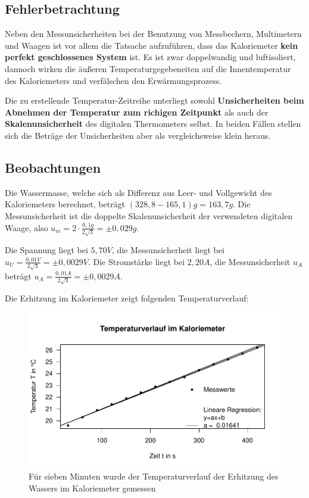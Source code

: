 \documentclass[class=article, crop=false]{standalone}
\begin{document}
\hypertarget{fehlerbetrachtung}{%
\subsection{Fehlerbetrachtung}\label{fehlerbetrachtung}}

Neben den Messunsicherheiten bei der Benutzung von Messbechern,
Multimetern und Waagen ist vor allem die Tatsache aufzuführen, dass das
Kaloriemeter \textbf{kein perfekt geschlossenes System} ist. Es ist zwar
doppelwandig und luftisoliert, dannoch wirken die äußeren
Temperaturgegebeneiten auf die Innentemperatur des Kaloriemeters und
verfälschen den Erwärmungsprozess.

Die zu erstellende Temperatur-Zeitreihe unterliegt sowohl
\textbf{Unsicherheiten beim Abnehmen der Temperatur zum richigen
Zeitpunkt} als auch der \textbf{Skalenunsicherheit} des digitalen
Thermometers selbst. In beiden Fällen stellen sich die Beträge der
Unsicherheiten aber als vergleichsweise klein heraus.

\hypertarget{beobachtungen}{%
\subsection{Beobachtungen}\label{beobachtungen}}

Die Wassermasse, welche sich als Differenz aus Leer- und Vollgewicht des
Kaloriemeters berechnet, beträgt \((328,8-165,1)g=163,7g\). Die
Messunsicherheit ist die doppelte Skalenunsicherheit der verwendeten
digitalen Waage, also \(u_m=2\cdot \frac{0,1g}{2\sqrt{3}} = \pm0,029g\).

Die Spannung liegt bei \(5,70V\), die Messunsicherheit liegt bei
\(u_U=\frac{0,01V}{2\sqrt{3}}= \pm0,0029V\). Die Stromstärke liegt bei
\(2,20A\), die Messunsicherheit \(u_A\) beträgt
\(u_A=\frac{0,01A}{2\sqrt{3}}=\pm0,0029A\).

Die Erhitzung im Kaloriemeter zeigt folgenden Temperaturverlauf:

\begin{figure}

{\centering \includegraphics{Kaloriemeter_files/figure-latex/unnamed-chunk-1-1} 

}

\caption{Für sieben Minuten wurde der Temperaturverlauf der Erhitzung des Wassers im Kaloriemeter gemessen}\label{fig:unnamed-chunk-1}
\end{figure}
\end{document}
